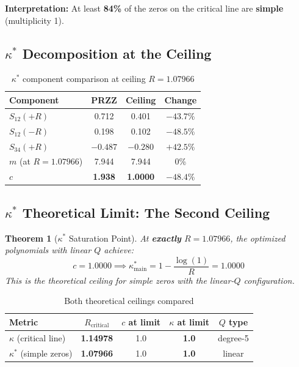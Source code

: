 \documentclass[11pt]{article}
\newtheorem{theorem}{Theorem}
\begin{document}
\textbf{Interpretation:} At least \textbf{84\%} of the zeros on the critical line are \textbf{simple} (multiplicity 1).

\subsection{$\kappa^*$ Decomposition at the Ceiling}

\begin{table}[h]
\centering
\caption{$\kappa^*$ component comparison at ceiling $R = 1.07966$}
\begin{tabular}{lccc}
\toprule
Component & PRZZ & \textbf{Ceiling} & Change \\
\midrule
$S_{12}(+R)$ & 0.712 & 0.401 & $-43.7\%$ \\
$S_{12}(-R)$ & 0.198 & 0.102 & $-48.5\%$ \\
$S_{34}(+R)$ & $-0.487$ & $-0.280$ & $+42.5\%$ \\
$m$ (at $R=1.07966$) & 7.944 & 7.944 & 0\% \\
\midrule
\textbf{$c$} & \textbf{1.938} & \textbf{1.0000} & \textbf{$-48.4\%$} \\
\bottomrule
\end{tabular}
\end{table}

\subsection{$\kappa^*$ Theoretical Limit: The Second Ceiling}

\begin{theorem}[$\kappa^*$ Saturation Point]
At \textbf{exactly} $R = 1.07966$, the optimized polynomials with linear $Q$ achieve:
\begin{equation}
\boxed{c = 1.0000 \implies \kappa^*_{\text{main}} = 1 - \frac{\log(1)}{R} = 1.0000}
\end{equation}
This is the theoretical ceiling for simple zeros with the linear-$Q$ configuration.
\end{theorem}

\begin{table}[h]
\centering
\caption{Both theoretical ceilings compared}
\begin{tabular}{lcccc}
\toprule
Metric & $R_{\text{critical}}$ & $c$ at limit & $\kappa$ at limit & $Q$ type \\
\midrule
$\kappa$ (critical line) & \textbf{1.14978} & 1.0 & \textbf{1.0} & degree-5 \\
$\kappa^*$ (simple zeros) & \textbf{1.07966} & 1.0 & \textbf{1.0} & linear \\
\bottomrule
\end{tabular}
\end{table}
\end{document}

